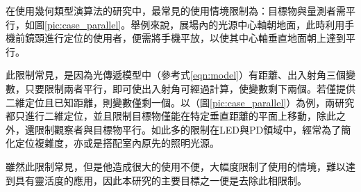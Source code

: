 \begin{description}
        \qquad

        在使用幾何類型演算法的研究中，最常見的使用情境限制為：目標物與量測者需平行，如圖\ref{pic:case_parallel}。舉例來說，展場內的光源中心軸朝地面，此時利用手機前鏡頭進行定位的使用者，便需將手機平放，以使其中心軸垂直地面朝上達到平行。

        \qquad
        此限制常見，是因為光傳遞模型中（參考式\ref{eqn:model}）有距離、出入射角三個變數，只要限制兩者平行，即可使出入射角可經過計算，使變數剩下兩個。若僅提供二維定位且已知距離，則變數僅剩一個。以\cite{case:aoa}（圖\ref{pic:case_parallel}）\cite{case:cart2d}為例，兩研究都只進行二維定位，並且限制目標物僅能在特定垂直距離的平面上移動，除此之外，還限制觀察者與目標物平行。如此多的限制在LED與PD領域中，經常為了簡化定位複雜度，亦或是搭配室內原先的照明光源。

        \qquad
        雖然此限制常見，但是他造成很大的使用不便，大幅度限制了使用的情境，難以達到具有靈活度的應用，因此本研究的主要目標之一便是去除此相限制。

    \end{description}






        
        

